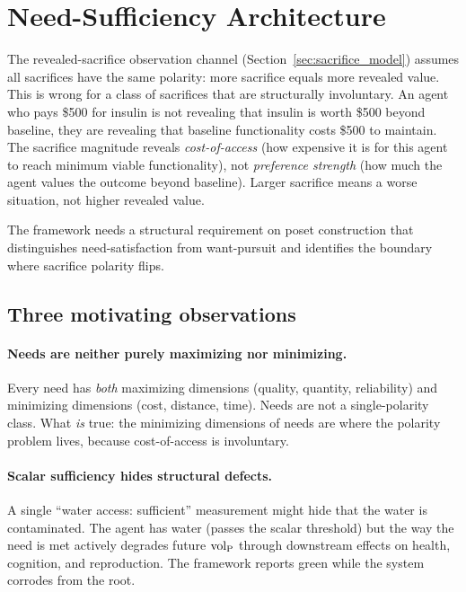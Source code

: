 \section{Need-Sufficiency Architecture}
\label{sec:need_sufficiency}

The revealed-sacrifice observation channel
(Section~\ref{sec:sacrifice_model}) assumes all sacrifices have
the same polarity: more sacrifice equals more revealed value.
This is wrong for a class of sacrifices that are structurally
involuntary.  An agent who pays \$500 for insulin is not revealing
that insulin is worth \$500 beyond baseline, they are revealing
that baseline functionality costs \$500 to maintain.  The sacrifice
magnitude reveals \emph{cost-of-access} (how expensive it is for
this agent to reach minimum viable functionality), not
\emph{preference strength} (how much the agent values the outcome
beyond baseline).  Larger sacrifice means a worse situation, not
higher revealed value.

The framework needs a structural requirement on poset
construction that distinguishes need-satisfaction from want-pursuit
and identifies the boundary where sacrifice polarity flips.

\subsection{Three motivating observations}

\paragraph{Needs are neither purely maximizing nor minimizing.}
Every need has \emph{both} maximizing dimensions (quality, quantity,
reliability) and minimizing dimensions (cost, distance, time). Needs are not a
single-polarity class. What \emph{is} true: the minimizing dimensions of needs
are where the polarity problem lives, because cost-of-access is involuntary.

\paragraph{Scalar sufficiency hides structural defects.}
A single ``water access: sufficient'' measurement might hide that the water is
contaminated.  The agent has water (passes the scalar threshold) but the way
the need is met actively degrades future ${\operatorname{vol}_{\mathrm{P}}}$ through downstream effects on
health, cognition, and reproduction.  The framework reports green while the
system corrodes from the root.

